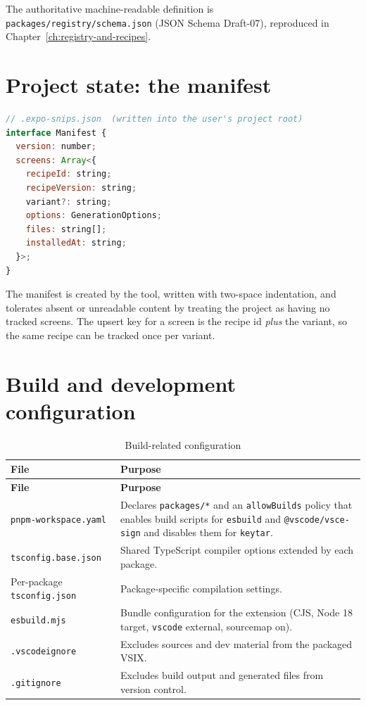 The authoritative machine-readable definition is
\texttt{packages/registry/schema.json} (JSON Schema Draft-07), reproduced in
Chapter~\ref{ch:registry-and-recipes}.

\section{Project state: the manifest}

\begin{lstlisting}[language=JavaScript]
// .expo-snips.json  (written into the user's project root)
interface Manifest {
  version: number;
  screens: Array<{
    recipeId: string;
    recipeVersion: string;
    variant?: string;
    options: GenerationOptions;
    files: string[];
    installedAt: string;
  }>;
}
\end{lstlisting}

The manifest is created by the tool, written with two-space indentation, and
tolerates absent or unreadable content by treating the project as having no
tracked screens. The upsert key for a screen is the recipe id \emph{plus} the
variant, so the same recipe can be tracked once per variant.

\section{Build and development configuration}

\begin{longtable}{@{}L{4.4cm}L{9.8cm}@{}}
\caption{Build-related configuration}\\
\toprule
\textbf{File} & \textbf{Purpose} \\
\midrule
\endfirsthead
\toprule
\textbf{File} & \textbf{Purpose} \\
\midrule
\endhead
\texttt{pnpm-workspace.yaml} & Declares \texttt{packages/*} and an
\texttt{allowBuilds} policy that enables build scripts for \texttt{esbuild} and
\texttt{@vscode/vsce-sign} and disables them for \texttt{keytar}. \\
\texttt{tsconfig.base.json} & Shared TypeScript compiler options extended by each
package. \\
Per-package \texttt{tsconfig.json} & Package-specific compilation settings. \\
\texttt{esbuild.mjs} & Bundle configuration for the extension (CJS, Node 18
target, \texttt{vscode} external, sourcemap on). \\
\texttt{.vscodeignore} & Excludes sources and dev material from the packaged
VSIX. \\
\texttt{.gitignore} & Excludes build output and generated files from version
control. \\
\bottomrule
\end{longtable}

